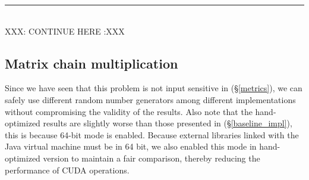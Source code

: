 \documentclass[11pt]{article}
\begin{document}
\newpage
{\center\color{red} \noindent\rule{16cm}{0.4pt} \\ XXX: CONTINUE HERE :XXX \\}
\subsection{Matrix chain multiplication}
Since we have seen that this problem is not input sensitive in (\S\ref{metrics}), we can safely use different random number generators among different implementations without compromising the validity of the results.  Also note that the hand-optimized results are slightly worse than those presented in (\S\ref{baseline_impl}), this is because 64-bit mode is enabled. Because external libraries linked with the Java virtual machine must be in 64 bit, we also enabled this mode in hand-optimized version to maintain a fair comparison, thereby reducing the performance of CUDA operations.
\end{document}
